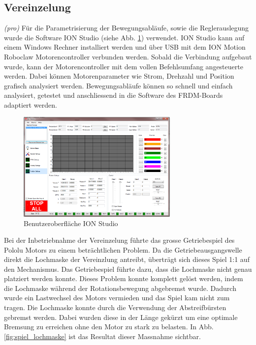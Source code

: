 \subsection{Vereinzelung} \label{sec:Inbetriebnahme_Vereinzelung}
\textit{(pro)} Für die Parametrisierung der Bewegungsabläufe, sowie die Reglerauslegung wurde die Software ION Studio (siehe Abb. \ref{fig:ION_Studio}) verwendet. ION Studio kann auf einem Windows Rechner installiert werden und über USB mit dem ION Motion Roboclaw Motorencontroller verbunden werden. Sobald die Verbindung aufgebaut wurde, kann der Motorencontroller mit dem vollen Befehlsumfang angesteuerte werden. Dabei können Motorenparameter wie Strom, Drehzahl und Position grafisch analysiert werden. Bewegungsabläufe können so schnell und einfach analysiert, getestet und anschliessend in die Software des FRDM-Boards adaptiert werden.

\begin{figure}[H]
	\includegraphics[draft=false,width=0.7\textwidth]{Illustrationen/7-Inbetriebnahme_und_Kalibration/ION_Studio.png}
	\caption{Benutzeroberfläche ION Studio}
	\label{fig:ION_Studio}
\end{figure}

Bei der Inbetriebnahme der Vereinzelung führte das grosse Getriebespiel des Pololu Motors zu einem beträchtlichen Problem. Da die Getriebeausgangswelle direkt die Lochmaske der Vereinzlung antreibt, überträgt sich dieses Spiel 1:1 auf den Mechanismus. Das Getriebespiel führte dazu, dass die Lochmaske nicht genau platziert werden konnte. Dieses Problem konnte komplett gelöst werden, indem die Lochmaske während der Rotationsbewegung abgebremst wurde. Dadurch wurde ein Lastwechsel des Motors vermieden und das Spiel kam nicht zum tragen. Die Lochmaske konnte durch die Verwendung der Abstreifbürsten gebremst werden. Dabei wurden diese in der Länge gekürzt um eine optimale Bremsung zu erreichen ohne den Motor zu stark zu belasten. In Abb. \ref{fig:spiel_lochmaske} ist das Resultat dieser Massnahme sichtbar.


